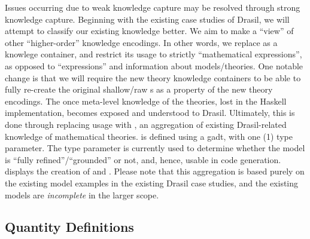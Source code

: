 Issues occurring due to weak knowledge capture may be resolved through strong
knowledge capture. Beginning with the existing case studies of Drasil, we will
attempt to classify our existing knowledge better. We aim to make
\RelationConcept{} a ``view'' of other ``higher-order'' knowledge encodings. In
other words, we replace \Expr{} as a knowlege container, and restrict its usage
to strictly ``mathematical expressions'', as opposed to ``expressions'' and
information about models/theories. One notable change is that we will require
the new theory knowledge containers to be able to fully re-create the original
shallow/raw \Expr{}s as a property of the new theory encodings. The once
meta-level knowledge of the theories, lost in the Haskell implementation,
becomes exposed and understood to Drasil. Ultimately, this is done through
replacing \RelationConcept{} usage with \ModelKind{}, an aggregation of existing
Drasil-related knowledge of mathematical theories. \ModelKind{} is defined using
a \acs{gadt}, with one (1) type parameter. The type parameter is currently used
to determine whether the model is ``fully refined''/``grounded'' or not, and,
hence, usable in code generation.  displays the
creation of \ModelKind{} and \ModelKinds{}. Please note that this aggregation is
based purely on the existing model examples in the existing Drasil case studies,
and the existing models are \textit{incomplete} in the larger scope.


\currentModelKindsHaskell{}

\subsection{Quantity Definitions}

